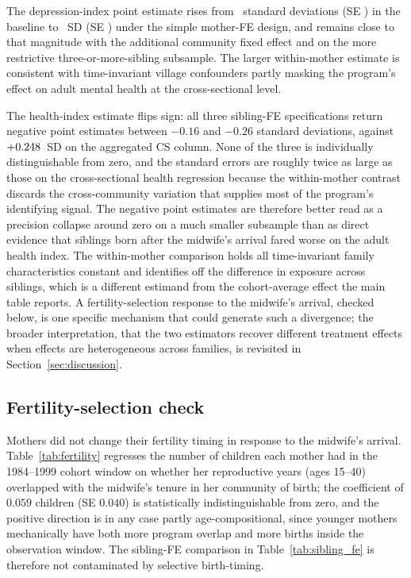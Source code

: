 The depression-index point estimate rises from \CoefDepTWFE~standard deviations (SE \SEDepTWFE) in the baseline to \CoefDepSibFE~SD (SE \SEDepSibFE) under the simple mother-FE design, and remains close to that magnitude with the additional community fixed effect and on the more restrictive three-or-more-sibling subsample. The larger within-mother estimate is consistent with time-invariant village confounders partly masking the program's effect on adult mental health at the cross-sectional level.

The health-index estimate flips sign: all three sibling-FE specifications return negative point estimates between $-0.16$ and $-0.26$ standard deviations, against $+0.248$~SD on the aggregated CS column. None of the three is individually distinguishable from zero, and the standard errors are roughly twice as large as those on the cross-sectional health regression because the within-mother contrast discards the cross-community variation that supplies most of the program's identifying signal. The negative point estimates are therefore better read as a precision collapse around zero on a much smaller subsample than as direct evidence that siblings born after the midwife's arrival fared worse on the adult health index. The within-mother comparison holds all time-invariant family characteristics constant and identifies off the difference in exposure across siblings, which is a different estimand from the cohort-average effect the main table reports. A fertility-selection response to the midwife's arrival, checked below, is one specific mechanism that could generate such a divergence; the broader interpretation, that the two estimators recover different treatment effects when effects are heterogeneous across families, is revisited in Section~\ref{sec:discussion}.

\subsection{Fertility-selection check}

Mothers did not change their fertility timing in response to the midwife's arrival. Table~\ref{tab:fertility} regresses the number of children each mother had in the 1984--1999 cohort window on whether her reproductive years (ages 15--40) overlapped with the midwife's tenure in her community of birth; the coefficient of $0.059$ children (SE $0.040$) is statistically indistinguishable from zero, and the positive direction is in any case partly age-compositional, since younger mothers mechanically have both more program overlap and more births inside the observation window. The sibling-FE comparison in Table~\ref{tab:sibling_fe} is therefore not contaminated by selective birth-timing.

